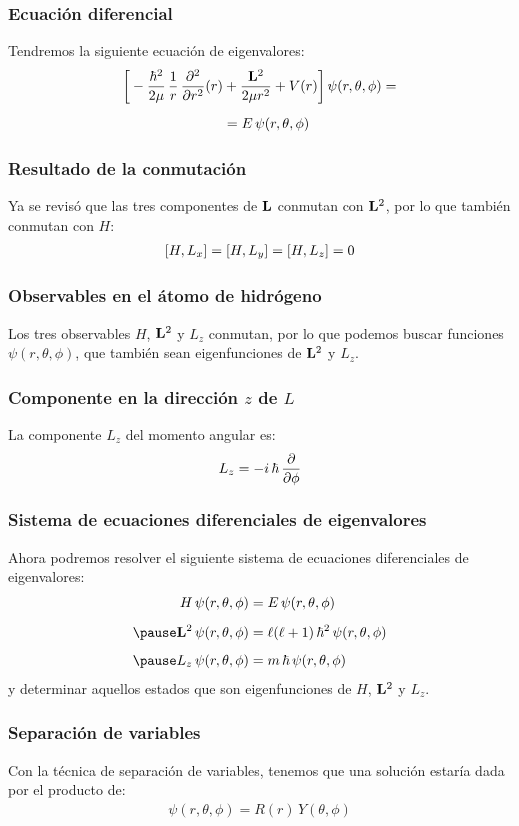 \documentclass[12pt]{beamer}
\begin{document}
\begin{frame}
\frametitle{Ecuación diferencial}
Tendremos la siguiente ecuación de eigenvalores:
\pause
\begin{align}
\begin{aligned}
\bigg[ - \dfrac{\hbar^{2}}{2 \mu} \, \dfrac{1}{r} \, \pdv[2]{r} (r) &+ \dfrac{\vb{L}^{2}}{2 \mu r^{2}} + V (r) \bigg] \, \psi (r, \theta, \phi) = \\[0.5em]
&= E \, \psi (r, \theta, \phi) 
\end{aligned}
\label{eq:ecuacion_08_01_02}
\end{align}
\end{frame}
\begin{frame}
\frametitle{Resultado de la conmutación}
Ya se revisó que las tres componentes de $\vb{L}$ conmutan con $\vb{L}^{2}$, por lo que también conmutan con $H$:
\pause
\begin{align}
\comm{H}{L_{x}} = \comm{H}{L_{y}} = \comm{H}{L_{z}} = 0
\label{eq:ecuacion_08_04}
\end{align}
\end{frame}
\begin{frame}
\frametitle{Observables en el átomo de hidrógeno}
Los tres observables $H$, $\vb{L}^{2}$ y $L_{z}$ conmutan, por lo que podemos buscar funciones $\psi (r, \theta, \phi)$, que también sean eigenfunciones de $\vb{L}^{2}$ y $L_{z}$.
\end{frame}
\begin{frame}
\frametitle{Componente en la dirección $z$ de $L$}
La componente $L_{z}$ del momento angular es:
\pause
\begin{align*}
L_{z} = - i \, \hbar \, \pdv{\phi}
\end{align*}
\end{frame}
\begin{frame}
\frametitle{Sistema de ecuaciones diferenciales de eigenvalores}
Ahora podremos resolver el siguiente sistema de ecuaciones diferenciales de eigenvalores:
\begin{eqnarray}
\begin{aligned}
H \, \psi (r, \theta, \phi) &= E \, \psi (r, \theta, \phi) \label{eq:ecuacion_08_05} \\[0.5em] \pause
\vb{L}^{2} \, \psi (r, \theta, \phi) &= \ell (\ell + 1) \, \hbar^{2} \, \psi (r, \theta, \phi) \label{eq:ecuacion_08_06} \\[0.5em] \pause
L_{z} \, \psi (r, \theta, \phi) &= m \, \hbar \, \psi (r, \theta, \phi) \label{eq:ecuacion_08_07}
\end{aligned}
\end{eqnarray}
\pause
y determinar aquellos estados que son eigenfunciones de $H$, $\vb{L}^{2}$ y $L_{z}$.
\end{frame}
\begin{frame}
\frametitle{Separación de variables}
Con la técnica de separación de variables, tenemos que una solución estaría dada por el producto de:
\pause
\begin{align}
\psi (r, \theta, \phi) = R (r) \, Y (\theta, \phi)
\label{eq:ecuacion_08_08}
\end{align}
\end{frame}
\end{document}
